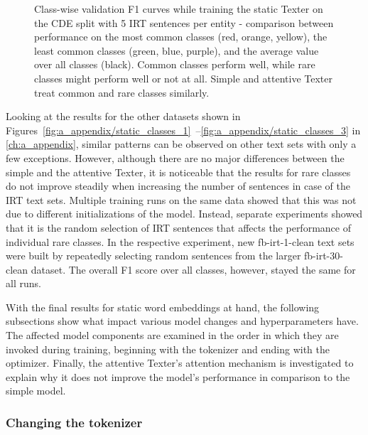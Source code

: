 \begin{figure}[t]
    \centering
    
    \caption{Class-wise validation F1 curves while training the static Texter on the CDE split with 5 IRT sentences per entity - comparison between performance on the most common classes (red, orange, yellow), the least common classes (green, blue, purple), and the average value over all classes (black). Common classes perform well, while rare classes might perform well or not at all. Simple and attentive Texter treat common and rare classes similarly.}
    \label{fig:5_experiments/3_texter/2_static/plot_class_curves}
\end{figure}

Looking at the results for the other datasets shown in Figures~\ref{fig:a_appendix/static_classes_1}~--\ref{fig:a_appendix/static_classes_3} in \autoref{ch:a_appendix}, similar patterns can be observed on other text sets with only a few exceptions. However, although there are no major differences between the simple and the attentive Texter, it is noticeable that the results for rare classes do not improve steadily when increasing the number of sentences in case of the IRT text sets. Multiple training runs on the same data showed that this was not due to different initializations of the model. Instead, separate experiments showed that it is the random selection of IRT sentences that affects the performance of individual rare classes. In the respective experiment, new fb-irt-1-clean text sets were built by repeatedly selecting random sentences from the larger fb-irt-30-clean dataset. The overall F1 score over all classes, however, stayed the same for all runs.

With the final results for static word embeddings at hand, the following subsections show what impact various model changes and hyperparameters have. The affected model components are examined in the order in which they are invoked during training, beginning with the tokenizer and ending with the optimizer. Finally, the attentive Texter's attention mechanism is investigated to explain why it does not improve the model's performance in comparison to the simple model.

\subsubsection{Changing the tokenizer}
\label{subsubsec:5_experiments/3_texter/2_static/1_tokenizer}


